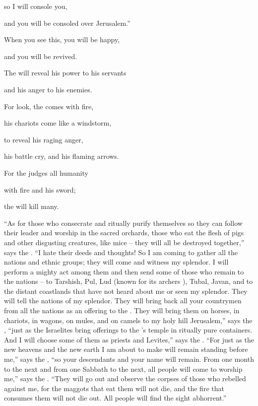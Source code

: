 {\par }{\Q so
I
will console
you,
\par }{\Q and you will be consoled
over Jerusalem.”
\par }{\Q {}When you see
this, you will be happy,
\par }{\Q and you will be revived.
\par }{\Q The
{}
will reveal
his power
to
his servants
\par }{\Q and his anger
to his enemies.
\par }{\Q {}For
look,
the {}
comes
with fire,
\par }{\Q his chariots
come like a windstorm,
\par }{\Q to reveal
his raging
anger,
\par }{\Q his battle cry,
and his flaming
arrows.
\par }{\Q {}For
the {}
judges
all
humanity
\par }{\Q with fire
and his sword;
\par }{\Q the {}
will kill many.
\par }{\PP {}“As for those who consecrate
and ritually purify
themselves so they can follow
their leader and worship in the sacred orchards,
those who eat
the flesh
of pigs
and other disgusting
creatures, like mice –
they will all be destroyed
together,”
says
the {}.
“I
hate their deeds
and thoughts! So I am coming
to gather
all
the nations
and ethnic
groups; they will come
and witness
my splendor.
I will perform
a mighty act
among them and then send
some of those who remain
to
the nations
– to Tarshish,
Pul,
Lud
(known
for its archers
), Tubal,
Javan,
and to the distant
coastlands
that
have not
heard
about me or
seen
my splendor.
They will tell
the nations
of my splendor.
They will bring
back all
your countrymen
from all
the nations
as an offering
to the
{}. They will bring them on horses,
in chariots,
in wagons,
on mules,
and on
camels
to my holy
hill
Jerusalem,”
says
the {}, “just as the Israelites
bring
offerings
to the
{}’s
temple
in ritually pure
containers.
And I will choose some
of them
as
priests
and Levites,”
says
the {}.
“For
just
as the new
heavens
and the new
earth
I am
about
to make
will remain standing
before
me,” says
the {}, “so
your descendants
and your name
will remain.
From one
month
to the next
and from
one Sabbath
to the next, all
people
will come
to worship
me,”
says
the {}.
“They will go out
and observe
the corpses
of those
who rebelled
against me, for
the maggots
that eat them will not
die,
and the fire
that consumes
them will not
die out. All
people
will find the sight abhorrent.”
\par }